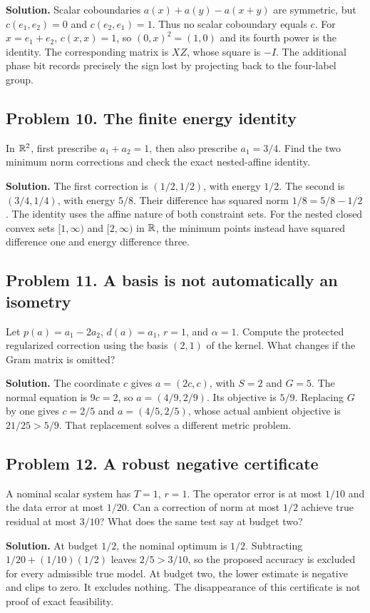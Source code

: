 \textbf{Solution.} Scalar coboundaries $a(x)+a(y)-a(x+y)$ are symmetric, but $c(e_1,e_2)=0$ and $c(e_2,e_1)=1$. Thus no scalar coboundary equals $c$. For $x=e_1+e_2$, $c(x,x)=1$, so $(0,x)^2=(1,0)$ and its fourth power is the identity. The corresponding matrix is $XZ$, whose square is $-I$. The additional phase bit records precisely the sign lost by projecting back to the four-label group.

\subsection*{Problem 10. The finite energy identity}
In $\mathbb R^2$, first prescribe $a_1+a_2=1$, then also prescribe $a_1=3/4$. Find the two minimum norm corrections and check the exact nested-affine identity.

\textbf{Solution.} The first correction is $(1/2,1/2)$, with energy $1/2$. The second is $(3/4,1/4)$, with energy $5/8$. Their difference has squared norm $1/8=5/8-1/2$. The identity uses the affine nature of both constraint sets. For the nested closed convex sets $[1,\infty)$ and $[2,\infty)$ in $\mathbb R$, the minimum points instead have squared difference one and energy difference three.

\subsection*{Problem 11. A basis is not automatically an isometry}
Let $p(a)=a_1-2a_2$, $d(a)=a_1$, $r=1$, and $\alpha=1$. Compute the protected regularized correction using the basis $(2,1)$ of the kernel. What changes if the Gram matrix is omitted?

\textbf{Solution.} The coordinate $c$ gives $a=(2c,c)$, with $S=2$ and $G=5$. The normal equation is $9c=2$, so $a=(4/9,2/9)$. Its objective is $5/9$. Replacing $G$ by one gives $c=2/5$ and $a=(4/5,2/5)$, whose actual ambient objective is $21/25>5/9$. That replacement solves a different metric problem.

\subsection*{Problem 12. A robust negative certificate}
A nominal scalar system has $T=1$, $r=1$. The operator error is at most $1/10$ and the data error at most $1/20$. Can a correction of norm at most $1/2$ achieve true residual at most $3/10$? What does the same test say at budget two?

\textbf{Solution.} At budget $1/2$, the nominal optimum is $1/2$. Subtracting $1/20+(1/10)(1/2)$ leaves $2/5>3/10$, so the proposed accuracy is excluded for every admissible true model. At budget two, the lower estimate is negative and clips to zero. It excludes nothing. The disappearance of this certificate is not proof of exact feasibility.

